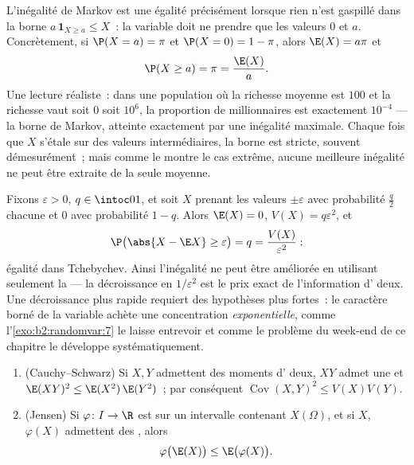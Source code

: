 \begin{example}\label{ex:b2:randomvar:markovsharp}
L'inégalité de Markov est une égalité précisément lorsque rien n'est
gaspillé dans la borne $a\,\mathbf 1_{X\geq a} \leq X$~: la
variable doit ne prendre que les valeurs $0$ et $a$. Concrètement,
si $\P(X = a) = \pi$ et $\P(X = 0) = 1 - \pi$, alors $\E(X)
= a\pi$ et
\[
\P(X \geq a) = \pi = \frac{\E(X)}{a} .
\]
Une lecture réaliste~: dans une population où la richesse moyenne est
$100$ et la richesse vaut soit $0$ soit $10^6$, la proportion de
millionnaires est exactement $10^{-4}$ --- la borne de Markov, atteinte
exactement par une inégalité maximale. Chaque fois que $X$ s'étale sur des
valeurs intermédiaires, la borne est stricte, souvent démesurément~;
mais comme le montre le cas extrême, aucune meilleure inégalité ne
peut être extraite de la seule moyenne.
\end{example}

\begin{example}\label{ex:b2:randomvar:chebsharp}
Fixons $\varepsilon > 0$, $q \in \intoc01$, et soit $X$ prenant les
valeurs $\pm\varepsilon$ avec probabilité $\frac q2$ chacune et
$0$ avec probabilité $1 - q$. Alors $\E(X) = 0$, $V(X) =
q\varepsilon^2$, et
\[
\P\bigl(\abs{X - \E X} \geq \varepsilon\bigr) = q
= \frac{V(X)}{\varepsilon^2} :
\]
égalité dans Tchebychev. Ainsi l'inégalité ne peut être améliorée
en utilisant seulement la  --- la décroissance en
$1/\varepsilon^2$ est le prix exact de l'information d' deux. Une
décroissance plus rapide requiert des hypothèses plus fortes~: le
caractère borné de la variable achète une concentration
\emph{exponentielle}, comme l'\cref{exo:b2:randomvar:7} le laisse
entrevoir et comme le problème du week-end de ce chapitre le développe
systématiquement.
\end{example}

\begin{theorem}\label{thm:b2:randomvar:jensen}
\leavevmode
\begin{enumerate}
\item (Cauchy--Schwarz) Si $X, Y$ admettent des moments d' deux, $XY$ admet une
 et $\E(XY)^2 \leq \E(X^2)\,\E(Y^2)$~; par conséquent
$\operatorname{Cov}(X,Y)^2 \leq V(X)V(Y)$.
\item (Jensen) Si $\varphi \colon I \to \R$ est  sur un
intervalle contenant $X(\Omega)$, et si $X$, $\varphi(X)$ admettent
des , alors
\[
\varphi\bigl(\E(X)\bigr) \leq \E\bigl(\varphi(X)\bigr) .
\]
\end{enumerate}
\end{theorem}

